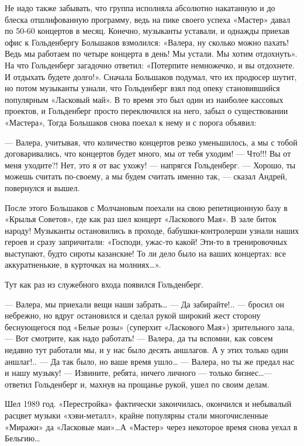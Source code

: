 \documentclass[16pt,a5paper,oneside]{book}
\begin{document}
Не надо также забывать, что группа исполняла абсолютно накатанную и до блеска отшлифованную программу, ведь на пике
своего успеха «Мастер» давал по 50-60 концертов в месяц. Конечно, музыканты уставали, и однажды приехав офис к
Гольденбергу Большаков взмолился: «Валера, ну сколько можно пахать! Ведь мы работаем по четыре концерта в день! Мы
устали. Мы хотим отдохнуть». На что Гольденберг загадочно ответил: «Потерпите немножечко, и вы отдохнете. И отдыхать
будете долго!». Сначала Большаков подумал, что их продюсер шутит, но потом музыканты узнали, что Гольденберг взял под
опеку становившийся популярным «Ласковый май». В то время это был один из наиболее кассовых проектов, и Гольденберг
просто переключился на него, забыл о существовании «Мастера», Тогда Большаков снова поехал к нему и с порога объявил:

— Валера, учитывая, что количество концертов резко уменьшилось, а мы с тобой договаривались, что концертов будет много,
мы от тебя уходим!
— Что!!! Вы от меня уходите?! Нет, это я от вас ухожу! — напрягся Гольденберг.
— Хорошо, ты можешь считать по-своему, а мы будем считать именно так, — сказал Андрей, повернулся и вышел.

После этого Большаков с Молчановым поехали на свою репетиционную базу в «Крылья Советов», где как раз шел концерт
«Ласкового Мая». В зале биток народу! Музыканты остановились в проходе, бабушки-контролерши узнали наших героев и сразу
запричитали: «Господи, ужас-то какой! Эти-то в тренировочных выступают, будто сироты казанские! То ли дело было на ваших
концертах: все аккуратненькие, в курточках на молниях\ldots».

Тут как раз из служебного входа появился Гольденберг.

— Валера, мы приехали вещи наши забрать\ldots
— Да забирайте!.. — бросил он небрежно, но вдруг остановился и сделал рукой широкий жест сторону беснующегося под «Белые
розы» (суперхит «Ласкового Мая») зрительного зала, — Вот смотрите, как надо работать!
— Валера, да ты вспомни, как совсем недавно тут работали мы, и у нас было десять аншлагов. А у этих только один
аншлаг!..
— Да так было, но ваше время ушло\ldots
— Валера, но ты же предал нас и нашу музыку!
— Извините, ребята, ничего личного — только бизнес\ldots — ответил Гольденберг и, махнув на прощанье рукой, ушел по
своим делам.

Шел 1989 год. «Перестройка» фактически закончилась, окончился и небывалый расцвет музыки «хэви-металл», крайне популярны
стали многочисленные «Миражи» да «Ласковые маи»\ldots А «Мастер» через некоторое время снова уехал в Бельгию\ldots
\end{document}
